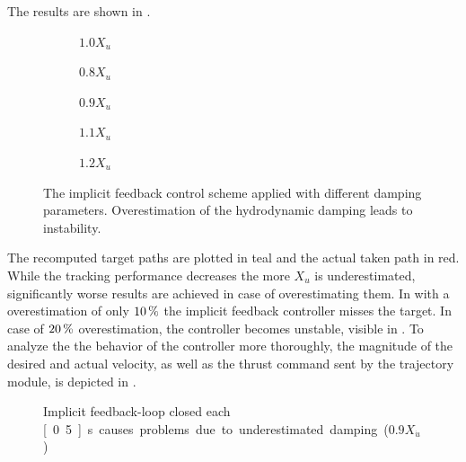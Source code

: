 The results are shown in .
\begin{figure}
	\centering
	\begin{subfigure}[t]{0.49\textwidth}
		\centering
		
		\caption{$1.0 X_u$}
	\end{subfigure}

	\begin{subfigure}[t]{0.49\textwidth}
		\centering
		
		\caption{$0.8 X_u$}
	\end{subfigure}
	\begin{subfigure}[t]{0.49\textwidth}
		\centering
		
		\caption{$0.9 X_u$}
	\end{subfigure}

	\begin{subfigure}[t]{0.49\textwidth}
		\centering
		
		\caption{$1.1 X_u$}
        \label{fig:slightly-overestimated-damping}
	\end{subfigure}
	\begin{subfigure}[t]{0.49\textwidth}
		\centering
		
		\caption{$1.2 X_u$}
        \label{fig:even-more-slightly-overestimated-damping}
	\end{subfigure}
	\caption{The implicit feedback control scheme applied with different damping parameters. Overestimation of the hydrodynamic damping leads to instability.}
    \label{fig:damping_analysis}
\end{figure}
The recomputed target paths are plotted in teal and the actual taken path in red.
While the tracking performance decreases the more $X_u$ is underestimated, significantly worse results are achieved in case of overestimating them. In  with a overestimation of only $\unit[10]{\%}$ the implicit feedback controller misses the target. In case of $\unit[20]{\%}$ overestimation, the controller becomes unstable, visible in . To analyze the the behavior of the controller more thoroughly, the magnitude of the desired and actual velocity, as well as the thrust command sent by the trajectory module, is depicted in .
\begin{figure}
	
	\caption{Implicit feedback-loop closed each \unit[0.5]{s} causes problems due to underestimated damping ($0.9 X_{\dot{u}}$)}
	\label{fig:implicit_problem_velocity}
\end{figure}

